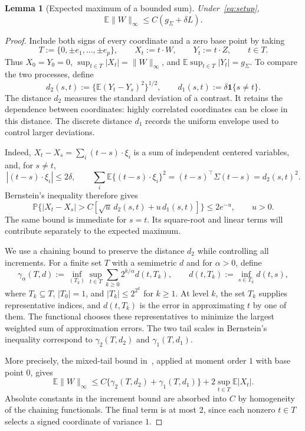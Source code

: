 \documentclass[11pt,letterpaper]{article}
\newtheorem{lemma}{Lemma}
\theoremstyle{remark}
\newcommand{\E}{\mathbb E}
\newcommand{\Pp}{\mathbb P}
\newcommand{\ind}{\mathbf 1}
\begin{document}
\begin{lemma}[Expected maximum of a bounded sum]
\label{intrinsic:lem:maximum}
Under~\eqref{eq:setup},
\begin{equation}\label{intrinsic:eq:maximum}
 \E\|W\|_\infty\le C(g_\Sigma+\delta L).
\end{equation}
\end{lemma}

\begin{proof}
Include both signs of every coordinate and a zero base point by
taking
\[
 T:=\{0,\pm e_1,\ldots,\pm e_p\},\qquad
 X_t:=t\cdot W,\qquad Y_t:=t\cdot Z,\qquad t\in T.
\]
Thus $X_0=Y_0=0$,
$\sup_{t\in T}|X_t|=\|W\|_\infty$, and
$\E\sup_{t\in T}|Y_t|=g_\Sigma$.
To compare the two processes, define
\[
 d_2(s,t):=\{\E(Y_t-Y_s)^2\}^{1/2},
 \qquad d_1(s,t):=\delta\ind\{s\ne t\}.
\]
The distance $d_2$ measures the standard deviation of a contrast.
It retains the dependence between coordinates: highly correlated
coordinates can be close in this distance. The discrete distance
$d_1$ records the uniform envelope used to control larger deviations.

Indeed, $X_t-X_s=\sum_i(t-s)\cdot\xi_i$ is a sum of independent
centered variables, and, for $s\ne t$,
\[
 |(t-s)\cdot\xi_i|\le2\delta,\qquad
 \sum_i\E\{(t-s)\cdot\xi_i\}^2
 =(t-s)^\top\Sigma(t-s)=d_2(s,t)^2.
\]
Bernstein's inequality therefore gives
\[
 \Pp\{|X_t-X_s|>C[\sqrt u\,d_2(s,t)+u\,d_1(s,t)]\}
 \le2e^{-u},\qquad u>0.
\]
The same bound is immediate for $s=t$. Its square-root and linear
terms will contribute separately to the expected maximum.

We use a chaining bound to preserve the distance $d_2$ while
controlling all increments. For a finite set $T$ with a semimetric
$d$ and for $\alpha>0$, define
\[
 \gamma_\alpha(T,d):=
 \inf_{(T_k)}\sup_{t\in T}
       \sum_{k\ge0}2^{k/\alpha}d(t,T_k),
 \qquad d(t,T_k):=\inf_{s\in T_k}d(t,s),
\]
where $T_k\subseteq T$, $|T_0|=1$, and
$|T_k|\le2^{2^k}$ for $k\ge1$.
At level $k$, the set $T_k$ supplies representative indices,
and $d(t,T_k)$ is the error in approximating $t$ by one of them.
The functional chooses these representatives to minimize the
largest weighted sum of approximation errors.
The two tail scales in Bernstein's inequality correspond to
$\gamma_2(T,d_2)$ and $\gamma_1(T,d_1)$.

More precisely, the mixed-tail bound
in~\cite[Theorem~3.5]{Dirksen2015}, applied at moment order $1$
with base point $0$, gives
\[
 \E\|W\|_\infty
 \le C\{\gamma_2(T,d_2)+\gamma_1(T,d_1)\}
       +2\sup_{t\in T}\E|X_t|.
\]
Absolute constants in the increment bound are absorbed into $C$
by homogeneity of the chaining functionals. The final term is at
most $2$, since each nonzero $t\in T$ selects a signed coordinate
of variance $1$.


\end{proof}
\end{document}
